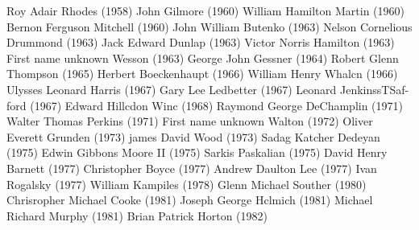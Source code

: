 \documentclass{report}
\begin{document}
\begin{refsegment}
\begin{multicols}{2}
Roy Adair Rhodes (1958)\newline
John Gilmore (1960)\newline
William Hamilton Martin (1960)\newline
Bernon Ferguson Mitchell (1960)\newline
John William Butenko (1963)\newline
Nelson Cornelious Drummond (1963)\newline
Jack Edward Dunlap (1963)\newline
Victor Norris Hamilton (1963)\newline
First name unknown Wesson (1963)\newline
George John Gessner (1964)\newline
Robert Glenn Thompson (1965)\newline
Herbert Boeckenhaupt (1966)\newline
William Henry Whalcn (1966)\newline
Ulysses Leonard Harris (1967)\newline
Gary Lee Ledbetter (1967)\newline
Leonard JenkinssTSaf-ford (1967)\newline
Edward Hillcdon Winc (1968)\newline
Raymond George DeChamplin (1971)\newline
Walter Thomas Perkins (1971)\newline
First name unknown Walton (1972)\newline
Oliver Everett Grunden (1973)\newline
james David Wood (1973)\newline
Sadag Katcher Dedeyan (1975)\newline
Edwin Gibbons Moore II (1975)\newline
Sarkis Paskalian (1975)\newline
David Henry Barnett (1977)\newline
Christopher Boyce (1977)\newline
Andrew Daulton Lee (1977)\newline
Ivan Rogalsky (1977)\newline
William Kampiles (1978)\newline
Glenn Michael Souther (1980)\newline
Chrisropher Michael Cooke (1981)\newline
Joseph George Hclmich (1981)\newline
Michael Richard Murphy (1981)\newline
Brian Patrick Horton (1982)\newline

\end{multicols}
\end{refsegment}
\end{document}
